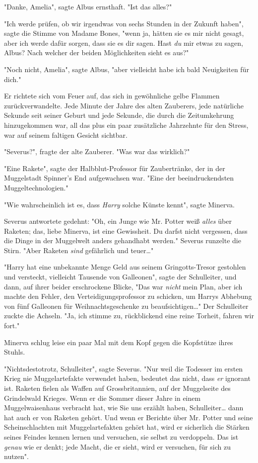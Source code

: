 {"Danke, Amelia", sagte Albus ernsthaft. "Ist das alles?"

"Ich werde prüfen, ob wir irgendwas von sechs Stunden in der Zukunft haben", sagte die Stimme von Madame Bones, "wenn ja, hätten sie es mir nicht gesagt, aber ich werde dafür sorgen, dass sie es dir sagen. Hast \emph{du} mir etwas zu sagen, Albus? Nach welcher der beiden Möglichkeiten sieht es aus?"

"Noch nicht, Amelia", sagte Albus, "aber vielleicht habe ich bald Neuigkeiten für dich."

Er richtete sich vom Feuer auf, das sich in gewöhnliche gelbe Flammen zurückverwandelte. Jede Minute der Jahre des alten Zauberers, jede natürliche Sekunde seit seiner Geburt und jede Sekunde, die durch die Zeitumkehrung hinzugekommen war, all das plus ein paar zusätzliche Jahrzehnte für den Stress, war auf seinem faltigen Gesicht sichtbar.

"Severus?", fragte der alte Zauberer. "Was war das wirklich?"

"Eine Rakete", sagte der Halbblut-Professor für Zaubertränke, der in der Muggelstadt Spinner's End aufgewachsen war. "Eine der beeindruckendsten Muggeltechnologien."

"Wie wahrscheinlich ist es, dass \emph{Harry} solche Künste kennt", sagte Minerva.

Severus antwortete gedehnt: "Oh, ein Junge wie Mr. Potter weiß \emph{alles} über Raketen; das, liebe Minerva, ist eine Gewissheit. Du darfst nicht vergessen, dass die Dinge in der Muggelwelt anders gehandhabt werden." Severus runzelte die Stirn. "Aber Raketen \emph{sind} gefährlich und teuer…"

"Harry hat eine unbekannte Menge Geld aus seinem Gringotts-Tresor gestohlen und versteckt, vielleicht Tausende von Galleonen", sagte der Schulleiter, und dann, auf ihrer beider erschrockene Blicke, "Das war \emph{nicht} mein Plan, aber ich machte den Fehler, den Verteidigungsprofessor zu schicken, um Harrys Abhebung von fünf Galleonen für Weihnachtsgeschenke zu beaufsichtigen…" Der Schulleiter zuckte die Achseln. "Ja, ich stimme zu, rückblickend eine reine Torheit, fahren wir fort."

Minerva schlug leise ein paar Mal mit dem Kopf gegen die Kopfstütze ihres Stuhls.

"Nichtsdestotrotz, Schulleiter", sagte Severus. "Nur weil die Todesser im ersten Krieg nie Muggelartefakte verwendet haben, bedeutet das nicht, dass \emph{er} ignorant ist. Raketen fielen als Waffen auf Grossbritannien, auf der Muggelseite des Grindelwald Krieges. Wenn er die Sommer dieser Jahre in einem Muggelwaisenhaus verbracht hat, wie Sie uns erzählt haben, Schulleiter… dann hat auch er von Raketen gehört. Und wenn er Berichte über Mr. Potter und seine Scheinschlachten mit Muggelartefakten gehört hat, wird er sicherlich die Stärken seines Feindes kennen lernen und versuchen, sie selbst zu verdoppeln. Das ist \emph{genau} wie er denkt; jede Macht, die er sieht, wird er versuchen, für sich zu nutzen".

}
